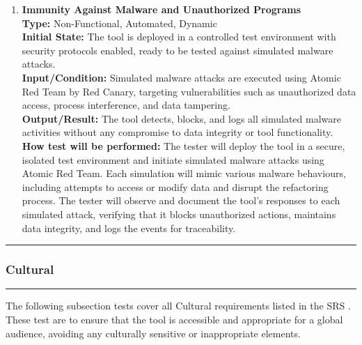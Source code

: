\documentclass[12pt, titlepage]{article}
\newcommand{\colorrule}{\textcolor{BlueViolet}{\rule{\linewidth}{2pt}}}
\begin{document}
\begin{enumerate}[label={\bf \textcolor{Maroon}{test-SRT-\arabic*}}, wide=0pt, font=\itshape]
  \item \textbf{Immunity Against Malware and Unauthorized Programs} \\[2mm]
    \textbf{Type:} Non-Functional, Automated, Dynamic \\
    \textbf{Initial State:} The tool is deployed in a controlled test environment with security protocols enabled, ready to be tested against simulated malware attacks. \\
    \textbf{Input/Condition:} Simulated malware attacks are executed using Atomic Red Team by Red Canary\cite{ARTCanary}, targeting vulnerabilities such as unauthorized data access, process interference, and data tampering. \\
    \textbf{Output/Result:} The tool detects, blocks, and logs all simulated malware activities without any compromise to data integrity or tool functionality. \\[2mm]
    \textbf{How test will be performed:} The tester will deploy the tool in a secure, isolated test environment and initiate simulated malware attacks using Atomic Red Team. Each simulation will mimic various malware behaviours, including attempts to access or modify data and disrupt the refactoring process. The tester will observe and document the tool's responses to each simulated attack, verifying that it blocks unauthorized actions, maintains data integrity, and logs the events for traceability.
\end{enumerate}

\newpage

\noindent
\colorrule

\subsubsection{Cultural}
\colorrule

\medskip

\noindent
The following subsection tests cover all Cultural requirements listed in the SRS \cite{SRS}. These test are to ensure that the tool is accessible and appropriate for a global audience, avoiding any culturally sensitive or inappropriate elements. 
\end{document}
